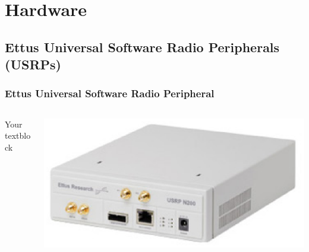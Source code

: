 \documentclass{beamer}
\begin{document}
\section{Hardware}

\subsection{Ettus Universal Software Radio Peripherals (USRPs)}

\begin{frame}
\frametitle{Ettus Universal Software Radio Peripheral}
  \begin{columns}[T]
    \begin{column}{.5\textwidth}
     \begin{block}{Your textblock}
    \end{block}
    \end{column}
    \begin{column}{.5\textwidth}
    \begin{block}{}
    \includegraphics[width=\textwidth]{n200.eps}
    \end{block}
    \end{column}
  \end{columns}
\end{frame}
\end{document}
